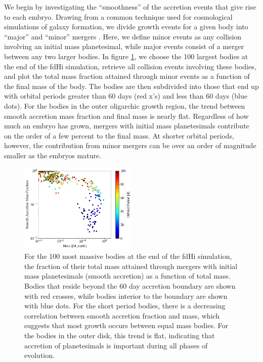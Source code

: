 \documentclass[twocolumn,linenumbers]{aastex63}
\begin{document}
We begin by investigating the ``smoothness'' of the accretion events
that give rise to each embryo. Drawing from a common technique used
for cosmological simulations of galaxy formation, we divide growth events for
a given body into ``major'' and ``minor'' mergers \citep{kauffmann93, murali02, lhullier12}. 
Here, we define minor events as any collision involving an initial mass 
planetesimal, while major events consist of a merger between any two larger bodies. In figure \ref{fig:minor_frac}, we choose the 
100 largest bodies at the end of the fdHi simulation, retrieve all collision events involving these bodies, and plot the total mass 
fraction attained through minor events as a function of the final mass of the body. The bodies are then subdivided into those that 
end up with orbital periods greater than 60 days (red x's) and less than 60 days (blue dots). For the bodies in the outer oligarchic 
growth region, the trend between smooth accretion mass fraction and final mass is nearly flat. Regardless of how much an 
embryo has grown, mergers with initial mass planetesimals contribute on the order of a few percent to the final mass.
At shorter orbital periods, however, the contribution from minor mergers can be over an order of magnitude smaller as the 
embryos mature.

\begin{figure}
\begin{center}
    \includegraphics[width=0.5\textwidth]{figures/minor_frac.png}
    \caption{For the 100 most massive bodies at the end of the fdHi simulation, the fraction of their total mass attained through mergers with initial mass planetesimals (smooth accretion) as a function of total mass. Bodies that reside beyond the 60 day accretion boundary are shown with red crosses, while bodies interior to the boundary are shown with blue dots. For the short period bodies, there is a decreasing correlation between smooth accretion fraction and mass, which suggests that most growth occurs between equal mass bodies. For the bodies in the outer disk, this trend is flat, indicating that accretion of planetesimals is important during all phases of evolution.\label{fig:minor_frac}}
\end{center}
\end{figure}
\end{document}
